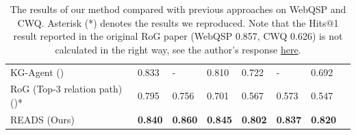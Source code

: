 \documentclass[11pt]{article}
\begin{document}
\begin{table}[]
{\begin{tabular}{llllllll}
KG-Agent (\citealp{jiang2024kg}) &0.833       &-       &0.810      &0.722       &-       &0.692      \\
RoG (Top-3 relation path) (\citealp{rog})* &0.795       &0.756       &0.701      &0.567       &0.573       &0.547      \\ \hline
READS (Ours)&\textbf{0.840}       &\textbf{0.860}     &\textbf{0.845}      &\textbf{0.802}       &\textbf{0.837}       &\textbf{0.820}      \\ \bottomrule[1pt]
\end{tabular}
}
\caption{The results of our method compared with previous approaches on WebQSP and CWQ. Asterisk (*) denotes the results we reproduced. Note that the Hits@1 result reported in the original RoG paper (WebQSP 0.857, CWQ 0.626) is not calculated in the right way, see the author's response \href{https://github.com/RManLuo/reasoning-on-graphs/issues/11}{here}.}
\label{table:main}
\end{table}
\end{document}
